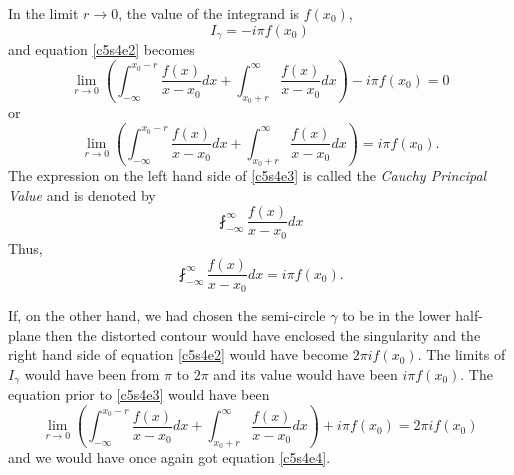In the limit $r \rightarrow 0$, the value of the integrand is $f(x_0)$,
\[
I_\gamma = -i\pi f(x_0)
\]
and equation \eqref{c5s4e2} becomes
\[
\lim_{r\rightarrow 0}\left(\int_{-\infty}^{x_0-r}\frac{f(x)}{x-x_0}dx +
\int_{x_0+r}^\infty\frac{f(x)}{x-x_0}dx\right) -i\pi f(x_0) = 0
\]
or
\begin{equation}\label{c5s4e3}
\lim_{r\rightarrow 0}\left(\int_{-\infty}^{x_0-r}\frac{f(x)}{x-x_0}dx +
\int_{x_0+r}^\infty\frac{f(x)}{x-x_0}dx\right) = i\pi f(x_0).
\end{equation}
The expression on the left hand side of \eqref{c5s4e3} is called the \emph{
Cauchy Principal Value} and is denoted by
\[
\fint_{-\infty}^\infty \frac{f(x)}{x-x_0}dx
\]
Thus,
\begin{equation}\label{c5s4e4}
\fint_{-\infty}^\infty \frac{f(x)}{x-x_0}dx = i\pi f(x_0).
\end{equation}

If, on the other hand, we had chosen the semi-circle $\gamma$ to be in the
lower half-plane then the distorted contour would have enclosed the singularity
and the right hand side of equation \eqref{c5s4e2} would have become $2\pi if(x_0)$.
The limits of $I_\gamma$ would have been from $\pi$ to $2\pi$ and its value
would have been $i\pi f(x_0)$. The equation prior to \eqref{c5s4e3} would have
been
\[
\lim_{r\rightarrow 0}\left(\int_{-\infty}^{x_0-r}\frac{f(x)}{x-x_0}dx +
\int_{x_0+r}^\infty\frac{f(x)}{x-x_0}dx\right) + i\pi f(x_0) = 2\pi if(x_0)
\]
and we would have once again got equation \eqref{c5s4e4}.

